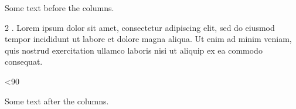 \documentclass{article}
\def\para{Lorem ipsum dolor sit amet, consectetur adipiscing elit, sed do
eiusmod tempor incididunt ut labore et dolore magna aliqua. Ut enim ad minim
veniam, quis nostrud exercitation ullamco laboris nisi ut aliquip ex ea
commodo consequat.\par}
\begin{document}
Some text before the columns.
\begin{multicols}{2}
 \loop \the\n. \para \advance{} \ifnum\n<90 \repeat
\end{multicols}
Some text after the columns.
\end{document}
